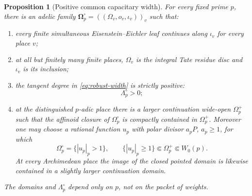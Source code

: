 \documentclass[11pt]{article}
\newtheorem{proposition}[proposition]{Proposition}
\theoremstyle{definition}
\theoremstyle{remark}
\begin{document}
\begin{proposition}[Positive common capacitary width]
\label{prop:positive-width}
For every fixed prime $p$, there is an adelic family
$\boldsymbol\Omega_p^\circ=((\Omega_v,o_v,\iota_v))_v$ such that:
\begin{enumerate}[label=\textup{(\roman*)},leftmargin=2.7em]
\item every finite simultaneous Eisenstein--Eichler leaf continues along
$\iota_v$ for every place $v$;
\item at all but finitely many finite places, $\Omega_v$ is the integral Tate
residue disc and $\iota_v$ is its inclusion;
\item the tangent degree in \eqref{eq:robust-width} is strictly positive:
\[
 \Lambda_p^\circ>0;
\]
\item at the distinguished $p$-adic place there is a larger continuation
wide-open $\Omega_p^+$ such that the affinoid closure of $\Omega_p^\circ$ is
compactly contained in $\Omega_p^+$.  Moreover one may choose a rational
function $u_p$ with polar divisor $a_pP$, $a_p\ge1$, for which
\begin{equation}\label{eq:nested-lemniscate}
 \Omega_p^\circ=\{|u_p|_p>1\},
 \qquad
 \{|u_p|_p\ge1\}\Subset\Omega_p^+\Subset W_0(p).
\end{equation}
At every Archimedean place the image of the closed pointed domain is likewise
contained in a slightly larger continuation domain.
\end{enumerate}
The domains and $\Lambda_p^\circ$ depend only on $p$, not on the packet of
weights.
\end{proposition}
\end{document}
